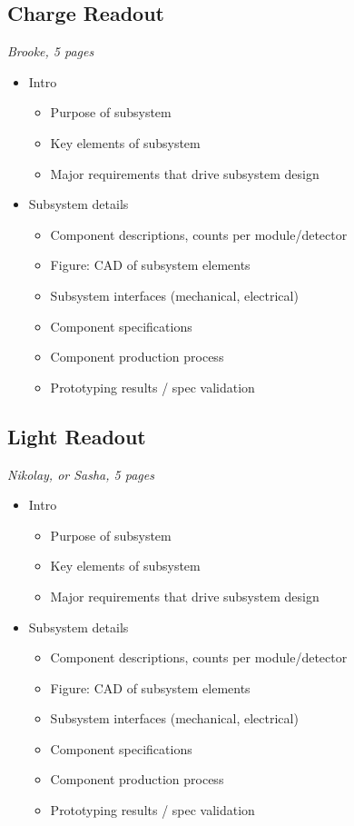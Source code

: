 \subsection{Charge Readout}
\label{sec:lartpc-des-chargero}
{\it Brooke, 5 pages}

\begin{itemize}
    \item Intro 
    \begin{itemize}
        \item Purpose of subsystem
        \item Key elements of subsystem
        \item Major requirements that drive subsystem design
    \end{itemize}
    \item Subsystem details
    \begin{itemize}
        \item Component descriptions, counts per module/detector
        \item Figure: CAD of subsystem elements
        \item Subsystem interfaces (mechanical, electrical)
        \item Component specifications
        \item Component production process
        \item Prototyping results / spec validation
    \end{itemize}
\end{itemize}


\subsection{Light Readout}
\label{sec:lartpc-des-lightro}
{\it Nikolay, or Sasha, 5 pages}

\begin{itemize}
    \item Intro 
    \begin{itemize}
        \item Purpose of subsystem
        \item Key elements of subsystem
        \item Major requirements that drive subsystem design
    \end{itemize}
    \item Subsystem details
    \begin{itemize}
        \item Component descriptions, counts per module/detector
        \item Figure: CAD of subsystem elements
        \item Subsystem interfaces (mechanical, electrical)
        \item Component specifications
        \item Component production process
        \item Prototyping results / spec validation
    \end{itemize}
\end{itemize}


